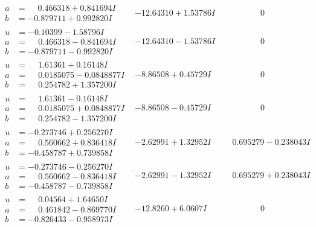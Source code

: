 \documentclass[1p]{elsarticle_modified}
\theoremstyle{definition}
\begin{document}
$$\begin{array}{c|c|c}
\begin{aligned}
a &= \phantom{-}0.466318 + 0.841694 I \\
b &= -0.879711 + 0.992820 I\end{aligned}
 & -12.64310 + 1.53786 I & \phantom{-0.000000 } 0 \\ \hline\begin{aligned}
u &= -0.10399 - 1.58796 I \\
a &= \phantom{-}0.466318 - 0.841694 I \\
b &= -0.879711 - 0.992820 I\end{aligned}
 & -12.64310 - 1.53786 I & \phantom{-0.000000 } 0 \\ \hline\begin{aligned}
u &= \phantom{-}1.61361 + 0.16148 I \\
a &= \phantom{-}0.0185075 - 0.0848877 I \\
b &= \phantom{-}0.254782 + 1.357200 I\end{aligned}
 & -8.86508 + 0.45729 I & \phantom{-0.000000 } 0 \\ \hline\begin{aligned}
u &= \phantom{-}1.61361 - 0.16148 I \\
a &= \phantom{-}0.0185075 + 0.0848877 I \\
b &= \phantom{-}0.254782 - 1.357200 I\end{aligned}
 & -8.86508 - 0.45729 I & \phantom{-0.000000 } 0 \\ \hline\begin{aligned}
u &= -0.273746 + 0.256270 I \\
a &= \phantom{-}0.560662 + 0.836418 I \\
b &= -0.458787 + 0.739858 I\end{aligned}
 & -2.62991 + 1.32952 I & \phantom{-}0.695279 - 0.238043 I \\ \hline\begin{aligned}
u &= -0.273746 - 0.256270 I \\
a &= \phantom{-}0.560662 - 0.836418 I \\
b &= -0.458787 - 0.739858 I\end{aligned}
 & -2.62991 - 1.32952 I & \phantom{-}0.695279 + 0.238043 I \\ \hline\begin{aligned}
u &= \phantom{-}0.04564 + 1.64650 I \\
a &= \phantom{-}0.461842 - 0.869770 I \\
b &= -0.826433 - 0.958973 I\end{aligned}
 & -12.8260 + 6.0607 I & \phantom{-0.000000 } 0\\

\end{array}$$
\end{document}
